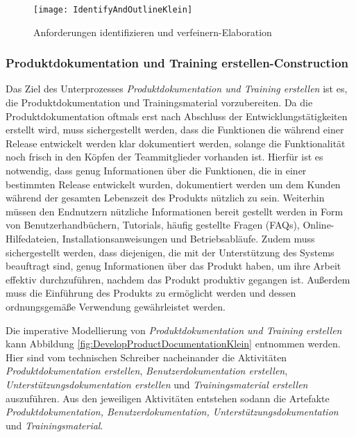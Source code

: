 \begin{figure}[[!htbp]
\begin{center}
  \texttt{[image: IdentifyAndOutlineKlein]} %
  \caption{Anforderungen identifizieren und verfeinern-Elaboration}
  \label{fig:IdentifyAndOutlineKlein}
\end{center}
\end{figure}


\subsubsection{Produktdokumentation und Training erstellen-Construction}
 Das Ziel des Unterprozesses \textit{Produktdokumentation und Training erstellen} ist es, die Produktdokumentation und Trainingsmaterial vorzubereiten. Da die Produktdokumentation oftmals erst nach Abschluss der Entwicklungstätigkeiten erstellt wird, muss sichergestellt werden, dass die Funktionen die während einer Release entwickelt werden klar dokumentiert werden, solange die Funktionalität noch frisch in den Köpfen der Teammitglieder vorhanden ist.\newline
 Hierfür ist es notwendig, dass genug Informationen über die Funktionen, die in einer bestimmten Release entwickelt wurden, dokumentiert werden um dem Kunden während der gesamten Lebenszeit des Produkts nützlich zu sein.\newline
 Weiterhin müssen den Endnutzern nützliche Informationen bereit gestellt werden in Form von Benutzerhandbüchern, Tutorials, häufig gestellte Fragen (FAQs), Online-Hilfedateien, Installationsanweisungen und Betriebsabläufe. \newline
 Zudem muss sichergestellt werden, dass diejenigen, die mit der Unterstützung des Systems beauftragt sind, genug Informationen über das Produkt haben, um ihre Arbeit effektiv durchzuführen, nachdem das Produkt produktiv gegangen ist. \newline
 Außerdem muss die Einführung des Produkts zu ermöglicht werden und dessen ordnungsgemäße Verwendung gewährleistet werden.\newline
 
 Die imperative Modellierung von \textit{Produktdokumentation und Training erstellen} kann Abbildung \ref{fig:DevelopProductDocumentationKlein} entnommen werden.\newline
 Hier sind vom technischen Schreiber nacheinander die Aktivitäten \textit{Produktdokumentation erstellen}, \textit{Benutzerdokumentation erstellen}, \textit{Unterstützungsdokumentation erstellen} und \textit{Trainingsmaterial erstellen} auszuführen. Aus den jeweiligen Aktivitäten entstehen sodann die Artefakte \textit{Produktdokumentation, Benutzerdokumentation, Unterstützungsdokumentation} und \textit{Trainingsmaterial}.
 

